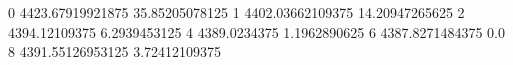 0 4423.67919921875 35.85205078125
1 4402.03662109375 14.20947265625
2 4394.12109375 6.2939453125
4 4389.0234375 1.1962890625
6 4387.8271484375 0.0
8 4391.55126953125 3.72412109375
